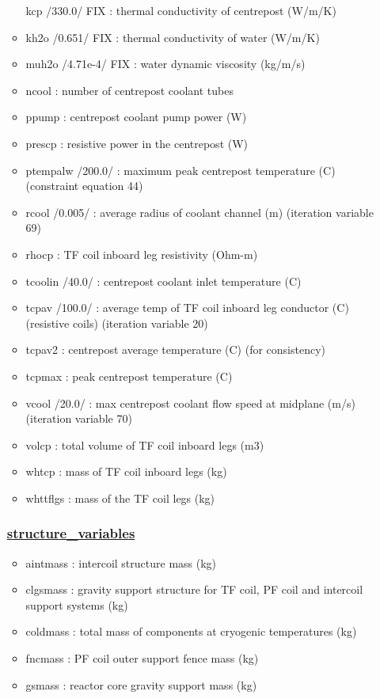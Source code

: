\documentclass[]{article}
\providecommand{\tightlist}{%
  \setlength{\itemsep}{0pt}\setlength{\parskip}{0pt}}
\begin{document}
\begin{itemize}
\begin{itemize}
    kcp /330.0/ FIX : thermal conductivity of centrepost (W/m/K)
  \item
    kh2o /0.651/ FIX : thermal conductivity of water (W/m/K)
  \item
    muh2o /4.71e-4/ FIX : water dynamic viscosity (kg/m/s)
  \item
    ncool : number of centrepost coolant tubes
  \item
    ppump : centrepost coolant pump power (W)
  \item
    prescp : resistive power in the centrepost (W)
  \item
    ptempalw /200.0/ : maximum peak centrepost temperature (C)
    (constraint equation 44)
  \item
    rcool /0.005/ : average radius of coolant channel (m) (iteration
    variable 69)
  \item
    rhocp : TF coil inboard leg resistivity (Ohm-m)
  \item
    tcoolin /40.0/ : centrepost coolant inlet temperature (C)
  \item
    tcpav /100.0/ : average temp of TF coil inboard leg conductor (C)
    (resistive coils) (iteration variable 20)
  \item
    tcpav2 : centrepost average temperature (C) (for consistency)
  \item
    tcpmax : peak centrepost temperature (C)
  \item
    vcool /20.0/ : max centrepost coolant flow speed at midplane (m/s)
    (iteration variable 70)
  \item
    volcp : total volume of TF coil inboard legs (m3)
  \item
    whtcp : mass of TF coil inboard legs (kg)
  \item
    whttflgs : mass of the TF coil legs (kg)
  \end{itemize}

  \subsubsection{\texorpdfstring{\href{structure_variables.html}{structure\_variables}}{structure\_variables}}\label{structure_variables}

  \begin{itemize}
  \tightlist
  \item
    aintmass : intercoil structure mass (kg)
  \item
    clgsmass : gravity support structure for TF coil, PF coil and
    intercoil support systems (kg)
  \item
    coldmass : total mass of components at cryogenic temperatures (kg)
  \item
    fncmass : PF coil outer support fence mass (kg)
  \item
    gsmass : reactor core gravity support mass (kg)
  \end{itemize}


\end{itemize}
\end{document}
